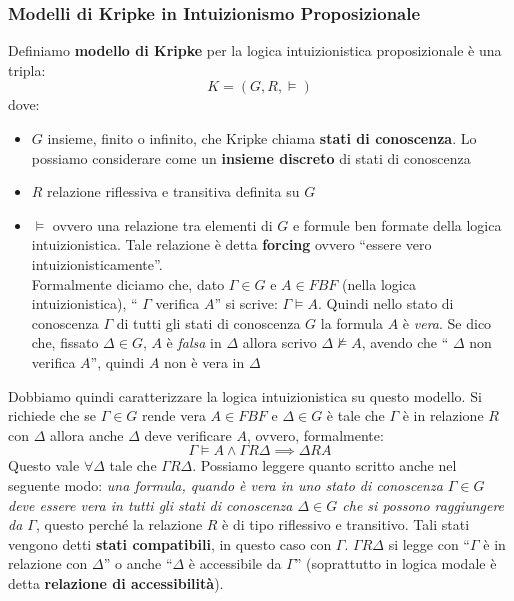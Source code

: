 \documentclass[a4paper,12pt, oneside]{book}
\begin{document}
\subsubsection{Modelli di Kripke in Intuizionismo Proposizionale}
\begin{definizione}
  Definiamo \textbf{modello di Kripke} per la logica intuizionistica
  proposizionale è una tripla:
  \[K=(G, R, \vDash)\]
  dove:
  \begin{itemize}
    \item $G$ insieme, finito o infinito, che Kripke chiama \textbf{stati di
      conoscenza}. Lo possiamo considerare come un \textbf{insieme discreto} di
    stati di conoscenza 
    \item $R$ relazione riflessiva e transitiva definita su $G$
    \item $\vDash$ ovvero una relazione tra elementi di $G$ e formule ben
    formate della logica intuizionistica. Tale relazione è detta
    \textbf{forcing} ovvero ``essere vero intuizionisticamente''.\\
    Formalmente diciamo che, dato $\Gamma\in G$ e $A\in FBF$ (nella logica
    intuizionistica), ``$\,\,\Gamma$ verifica $A$'' si scrive: $\Gamma\vDash
    A$. Quindi nello stato di conoscenza $\Gamma$ di tutti gli stati di
    conoscenza $G$ la formula $A$ è \emph{vera}. Se dico che, fissato $\Delta\in
    G$, $A$ è \emph{falsa} in $\Delta$ allora scrivo $\Delta\nvDash A$, avendo
    che ``$\,\,\Delta$ non verifica $A$'', quindi $A$ non è vera in $\Delta$
  \end{itemize}
\end{definizione}
Dobbiamo quindi caratterizzare la logica intuizionistica su questo modello. Si
richiede che se $\Gamma\in G$ rende vera $A\in FBF$ e $\Delta\in G$ è tale che
$\Gamma$ è in relazione $R$ con $\Delta$ allora anche $\Delta$ deve verificare
$A$, ovvero, formalmente:
\[\Gamma\vDash A \land \Gamma R\Delta\implies \Delta R A\]
Questo vale $\forall \Delta$ tale che $\Gamma R \Delta$.
Possiamo leggere quanto scritto anche nel seguente modo: \textit{una formula,
  quando è vera in uno stato di conoscenza $\Gamma\in G$ deve essere vera in
  tutti gli stati di conoscenza $\Delta\in G$ che si possono raggiungere da
  $\Gamma$}, questo perché la relazione $R$ è di tipo riflessivo e
transitivo. Tali stati vengono detti \textbf{stati compatibili}, in questo caso
con $\Gamma$. $\Gamma R \Delta$ si legge con ``$\Gamma$ è in relazione con
$\Delta$'' o anche  ``$\Delta$ è accessibile da $\Gamma$'' (soprattutto in
logica modale è detta \textbf{relazione di accessibilità}).\\
\end{document}
